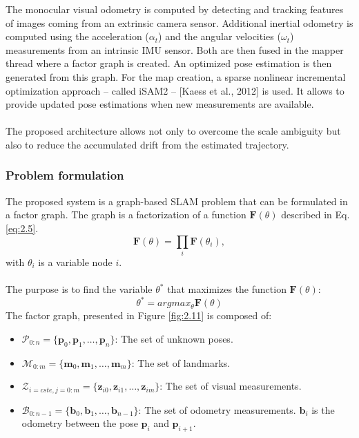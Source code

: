 \documentclass[11pt,openany]{book}
\begin{document}
The monocular visual odometry is computed by detecting and tracking features of images coming from an extrinsic camera sensor. Additional inertial odometry is computed using the acceleration ($\alpha_t$) and the angular velocities ($\omega_t$) measurements from an intrinsic IMU sensor. Both are then fused in the mapper thread where a factor graph is created. An optimized pose estimation is then generated from this graph. For the map creation, a sparse nonlinear incremental optimization approach – called iSAM2 – [Kaess et al., 2012] is used. It allows to provide updated pose estimations when new measurements are available. \\\\
The proposed architecture allows not only to overcome the scale ambiguity but also to reduce the accumulated drift from the estimated trajectory.
\subsubsection{Problem formulation}
The proposed system is a graph-based SLAM problem that can be formulated in a factor graph. The graph is a factorization of a function $\mathbf{F}(\theta)$ described in Eq.\ref{eq:2.5}.
\begin{equation} \label{eq:2.5}
    \mathbf{F}(\theta)=\prod_i\mathbf{F}(\theta_i),
\end{equation}
with $\theta_i$ is a variable node $i$.\\\\
The purpose is to find the variable $\theta^*$ that maximizes the function $\mathbf{F}(\theta)$:
\begin{equation}\label{eq:2.6}
    \theta^*=argmax_\theta\mathbf{F}(\theta)
\end{equation}
The factor graph, presented in Figure \ref{fig:2.11} is composed of:
\begin{itemize}
    \item $\mathcal{P}_{0:n}=\{\mathbf{p}_0,\mathbf{p}_1,\dots,\mathbf{p}_n\}$: The set of unknown poses.
    \item $\mathcal{M}_{0:m}=\{\mathbf{m}_0,\mathbf{m}_1,\dots,\mathbf{m}_m\}$: The set of landmarks.
    \item $\mathcal{Z}_{i=cste,j=0:m}=\{\mathbf{z}_{i0},\mathbf{z}_{i1},\dots,\mathbf{z}_{im}\}$: The set of visual measurements.
    \item $\mathcal{B}_{0:n-1}=\{\mathbf{b}_0,\mathbf{b}_1,\dots,\mathbf{b}_{n-1}\}$: The set of odometry measurements. $\mathbf{b}_i$ is the odometry between the pose $\mathbf{p}_i$ and $\mathbf{p}_{i+1}$.
\end{itemize}
\end{document}
